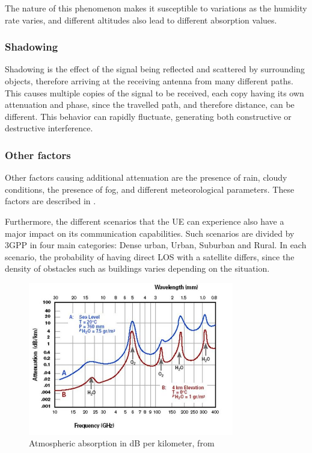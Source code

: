 The nature of this phenomenon makes it susceptible to variations as the humidity rate varies, and different altitudes also lead to different absorption values.

\subsubsection{Shadowing}
Shadowing is the effect of the signal being reflected and scattered by surrounding objects, therefore arriving at the receiving antenna from many different paths. This causes multiple copies of the signal to be received, each copy having its own attenuation and phase, since the travelled path, and therefore distance, can be different. This behavior can rapidly fluctuate, generating both constructive or destructive interference.

\subsubsection{Other factors}
Other factors causing additional attenuation are the presence of rain, cloudy conditions, the presence of fog, and different meteorological parameters. These factors are described in \cite{atm-effects-signal-prop}.

Furthermore, the different scenarios that the \ac{UE} can experience also have a major impact on its communication capabilities. Such scenarios are divided by \ac{3GPP} in four main categories: Dense urban, Urban, Suburban and Rural. In each scenario, the probability of having direct \ac{LOS} with a satellite differs, since the density of obstacles such as buildings varies depending on the situation.



\begin{figure}[ht]
    \centering
    \includegraphics[width=0.8\textwidth]{res/atm-absorp.jpg}
    \caption{Atmospheric absorption in dB per kilometer, from \cite{e-band-ammar}}
    \label{fig:atmospheric-abs}
\end{figure}



